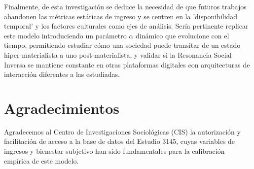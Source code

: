 \documentclass[a4paper,12pt]{article}
\begin{document}
Finalmente, de esta investigación se deduce la necesidad de que futuros trabajos abandonen las métricas estáticas de ingreso y se centren en la 'disponibilidad temporal' y los factores culturales como ejes de análisis. Sería pertinente replicar este modelo introduciendo un parámetro $\alpha$ dinámico que evolucione con el tiempo, permitiendo estudiar cómo una sociedad puede transitar de un estado hiper-materialista a uno post-materialista, y validar si la Resonancia Social Inversa se mantiene constante en otras plataformas digitales con arquitecturas de interacción diferentes a las estudiadas.

\newpage

\section*{Agradecimientos}

Agradecemos al Centro de Investigaciones Sociológicas (CIS) la autorización y facilitación de acceso a la base de datos del Estudio 3145, cuyas variables de ingresos y bienestar subjetivo han sido fundamentales para la calibración empírica de este modelo.

\end{document}
